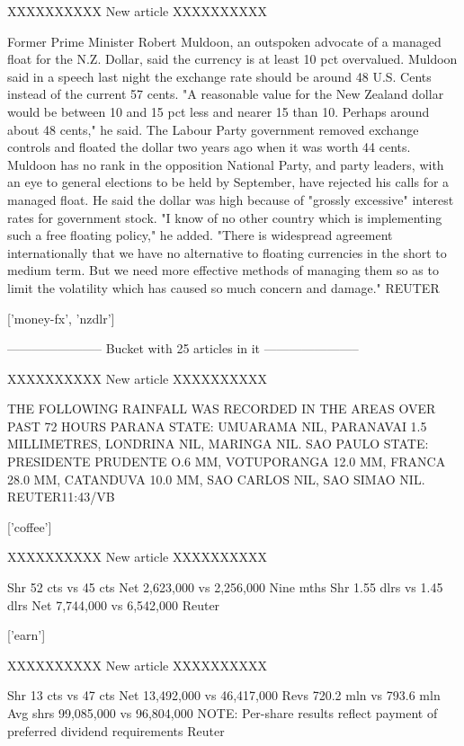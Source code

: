 \documentclass{article}
\begin{document}
\begin{pythonOutput}
['acq']

XXXXXXXXXX
New article
XXXXXXXXXX

Former Prime Minister Robert
Muldoon, an outspoken advocate of a managed float for the N.Z.
Dollar, said the currency is at least 10 pct overvalued.
    Muldoon said in a speech last night the exchange rate
should be around 48 U.S. Cents instead of the current 57 cents.
    "A reasonable value for the New Zealand dollar would be
between 10 and 15 pct less and nearer 15 than 10. Perhaps
around about 48 cents," he said.
    The Labour Party government removed exchange controls and
floated the dollar two years ago when it was worth 44 cents.
    Muldoon has no rank in the opposition National Party, and
party leaders, with an eye to general elections to be held by
September, have rejected his calls for a managed float.
    He said the dollar was high because of "grossly excessive"
interest rates for government stock.
    "I know of no other country which is implementing such a
free floating policy," he added. "There is widespread agreement
internationally that we have no alternative to floating
currencies in the short to medium term. But we need more
effective methods of managing them so as to limit the
volatility which has caused so much concern and damage."
 REUTER

['money-fx', 'nzdlr']

-----------------------
Bucket with 25 articles in it
-----------------------


XXXXXXXXXX
New article
XXXXXXXXXX

THE FOLLOWING RAINFALL WAS RECORDED IN
THE AREAS OVER PAST 72 HOURS
    PARANA STATE: UMUARAMA NIL, PARANAVAI 1.5 MILLIMETRES,
LONDRINA NIL, MARINGA NIL.
    SAO PAULO STATE: PRESIDENTE PRUDENTE O.6 MM, VOTUPORANGA
12.0 MM, FRANCA 28.0 MM, CATANDUVA 10.0 MM, SAO CARLOS NIL, SAO
SIMAO NIL. REUTER11:43/VB

['coffee']

XXXXXXXXXX
New article
XXXXXXXXXX

Shr 52 cts vs 45 cts
    Net 2,623,000 vs 2,256,000
    Nine mths
    Shr 1.55 dlrs vs 1.45 dlrs
    Net 7,744,000 vs 6,542,000
 Reuter

['earn']

XXXXXXXXXX
New article
XXXXXXXXXX

Shr 13 cts vs 47 cts
    Net 13,492,000 vs 46,417,000
    Revs 720.2 mln vs 793.6 mln
    Avg shrs 99,085,000 vs 96,804,000
    NOTE: Per-share results reflect payment of preferred
dividend requirements
 Reuter


\end{pythonOutput}
\end{document}
